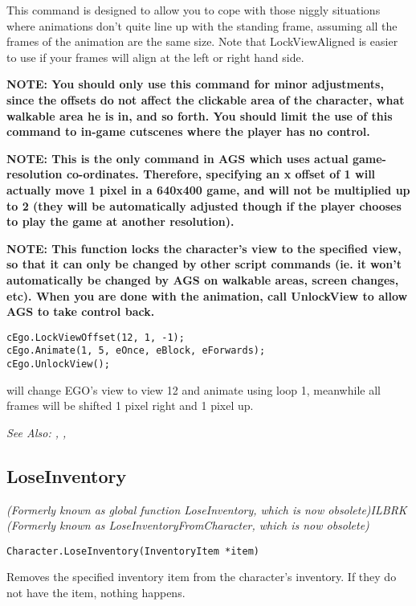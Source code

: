 This command is designed to allow you to cope with those niggly situations where animations
don't quite line up with the standing frame, assuming all the frames of the animation are
the same size. Note that LockViewAligned is easier to use if your frames will align at
the left or right hand side.

\bf{NOTE:} You should only use this command for minor adjustments, since the offsets do not
affect the clickable area of the character, what walkable area he is in, and so forth. You
should limit the use of this command to in-game cutscenes where the player has no control.

\bf{NOTE:} This is the only command in AGS which uses actual game-resolution co-ordinates.
Therefore, specifying an x offset of 1 will actually move 1 pixel in a 640x400 game, and will
not be multiplied up to 2 (they will be automatically adjusted though if the player chooses
to play the game at another resolution).

\bf{NOTE:} This function locks the character's view to the specified view, so
that it can only be changed by other script commands (ie. it won't
automatically be changed by AGS on walkable areas, screen changes, etc). When
you are done with the animation, call UnlockView to allow AGS to take control back.

\begin{verbatim}
cEgo.LockViewOffset(12, 1, -1);
cEgo.Animate(1, 5, eOnce, eBlock, eForwards);
cEgo.UnlockView();
\end{verbatim}
will change EGO's view to view 12 and animate using loop 1, meanwhile all frames will be
shifted 1 pixel right and 1 pixel up.

\it{See Also:} ,
,


\subsection{LoseInventory}\label{Character.LoseInventory}%

\it{(Formerly known as global function LoseInventory, which is now obsolete)}ILBRK
\it{(Formerly known as LoseInventoryFromCharacter, which is now obsolete)}

\begin{verbatim}
Character.LoseInventory(InventoryItem *item)
\end{verbatim}
Removes the specified inventory item from the character's inventory.
If they do not have the item, nothing happens.

